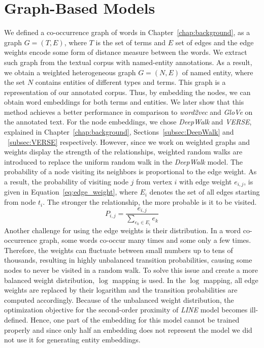 \section{Graph-Based Models}\label{sec:graph_based}
We defined a co-occurrence graph of words in Chapter~\ref{chap:background}, as a graph $G=(T,E)$, where $T$ is the set of terms and $E$ set of edges and the edge weights encode some form of distance measure between the words. We extract such graph from the textual corpus with named-entity annotations. As a result, we obtain a weighted heterogeneous graph $G=(N,E)$ of named entity, where the set $N$ contains entities of different types and terms. This graph is a representation of our annotated corpus. Thus, by embedding the nodes, we can obtain word embeddings for both terms and entities.  We later show that this method achieves a better performance in comparison to \emph{word2vec} and \emph{GloVe} on the annotated text. For the node embeddings, we chose \emph{DeepWalk} and \emph{VERSE}, explained in Chapter~\ref{chap:background}, Sections~\ref{subsec:DeepWalk} and ~\ref{subsec:VERSE} respectively. However, since we work on weighted graphs and weights display the strength of the relationships, weighted random walks are introduced to replace the uniform random walk in the \emph{DeepWalk} model. The probability of a node visiting its neighbors is proportional to the edge weight. As a result, the probability of visiting node $j$ from vertex $i$ with edge weight $e_{i,j}$,  is given in Equation~\ref{eq:edge_weight}, where $ E_{ i }$ denotes the set of all edges starting from node $t_{i}$. The stronger the relationship, the more probable is it to be visited. 
\begin{equation}
P_{i,j}=\frac{e_{i,j}}{\sum _{ e_{ k }\in E_{ i } }^{  }{ e_{k} } }
\label{eq:edge_weight}
\end{equation}
Another challenge for using the edge weights is their distribution. In a word co-occurrence
graph, some words co-occur many times and some only a few times. Therefore, the weights can fluctuate between small numbers up to tens of thousands, resulting in highly unbalanced transition probabilities, causing some nodes to never be visited in a random walk. To solve this issue and create a more balanced weight distribution, $ \log$ mapping is used. In the $\log$ mapping, all edge weights are replaced by their logarithm and the transition probabilities are computed accordingly. Because of the unbalanced weight distribution, the optimization objective for the second-order proximity of \emph{LINE} model becomes ill-defined. Hence, one part of the embedding for this model cannot be trained properly and since only half an embedding does not represent the model we did not use it for generating entity embeddings. \\
